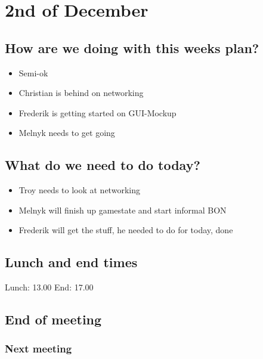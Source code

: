 \section{2nd of December}
\subsection{How are we doing with this weeks plan?}
\begin{itemize}
\item  Semi-ok
\item Christian is behind on networking
\item Frederik is getting started on GUI-Mockup
\item Melnyk needs to get going
\end{itemize}

\subsection{What do we need to do today?}
\begin{itemize}
\item Troy needs to look at networking
\item Melnyk will finish up gamestate and start informal BON
\item Frederik will get the stuff, he needed to do for today, done
\end{itemize}

\subsection{Lunch and end times}
Lunch:
13.00
End:
17.00
\subsection{End of meeting}

\subsubsection{Next meeting}
